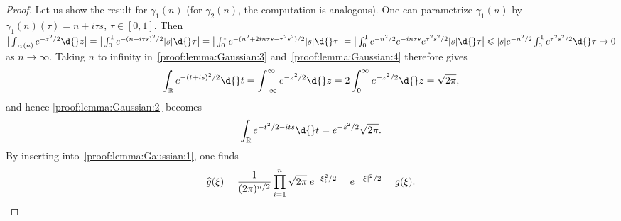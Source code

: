 \documentclass[12pt, oneside, a4paper]{article}
\theoremstyle{dfn}
\def\Rbb{\ensuremath{\mathbb{R}}}
\providecommand{\abs}[1]{\lvert#1\rvert}
\providecommand{\absbig}[1]{\big\lvert#1\big\rvert}
\begin{document}
\begin{proof}
{Let us show the result for $\gamma_1(n)$ (for $\gamma_2(n)$, the computation is analogous). One can parametrize $\gamma_1(n)$ by $\gamma_1(n)(\tau) = n + i\tau s$, $\tau \in [0,1]$. Then
$
\absbig{\int_{\gamma_1(n)} e^{-z^2/2} \d{}z}
= \absbig{\int_0^1 e^{-(n + i\tau s)^2/2} \abs{s} \d{}\tau}
= \absbig{\int_0^1 e^{-(n^2 + 2in\tau s - \tau^2 s^2)/2} \abs{s} \d{}\tau}
= \absbig{\int_0^1 e^{-n^2/2} e^{-in\tau s} e^{\tau^2 s^2/2} \abs{s} \d{}\tau}
\leqslant \abs{s} e^{-n^2/2} \int_0^1 e^{\tau^2 s^2/2} \d{}\tau \to 0
$
as $n \to \infty$.
}
Taking $n$ to infinity in~\eqref{proof:lemma:Gaussian:3} and~\eqref{proof:lemma:Gaussian:4} therefore gives
\[
\int_\Rbb e^{-(t+is)^2/2} \d{}t = \int_{-\infty}^\infty e^{-z^2/2} \d{}z = 2 \int_0^\infty e^{-z^2/2} \d{}z = \sqrt{2\pi},
\]
and hence \eqref{proof:lemma:Gaussian:2} becomes
\[
\int_\Rbb e^{-t^2 / 2 - its} \d{}t = e^{-s^2/2} \sqrt{2\pi}.
\]
By inserting into~\eqref{proof:lemma:Gaussian:1}, one finds
\[
\widehat{g}(\xi)
= \frac{1}{(2\pi)^{n/2}} \prod_{i=1}^n \sqrt{2\pi} \; e^{-\xi^2_i/2} = e^{-\abs{\xi}^2/2} = g(\xi). \qedhere
\]
\end{proof}
\end{document}
